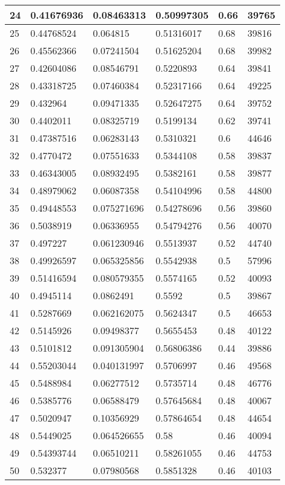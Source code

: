 \begin{longtable}{|l|l|l|l|l|l|}
24 & 0.41676936 & 0.08463313 & 0.50997305 & 0.66 & 39765 \\ \hline 
25 & 0.44768524 & 0.064815 & 0.51316017 & 0.68 & 39816 \\ \hline 
26 & 0.45562366 & 0.07241504 & 0.51625204 & 0.68 & 39982 \\ \hline 
27 & 0.42604086 & 0.08546791 & 0.5220893 & 0.64 & 39841 \\ \hline 
28 & 0.43318725 & 0.07460384 & 0.52317166 & 0.64 & 49225 \\ \hline 
29 & 0.432964 & 0.09471335 & 0.52647275 & 0.64 & 39752 \\ \hline 
30 & 0.4402011 & 0.08325719 & 0.5199134 & 0.62 & 39741 \\ \hline 
31 & 0.47387516 & 0.06283143 & 0.5310321 & 0.6 & 44646 \\ \hline 
32 & 0.4770472 & 0.07551633 & 0.5344108 & 0.58 & 39837 \\ \hline 
33 & 0.46343005 & 0.08932495 & 0.5382161 & 0.58 & 39877 \\ \hline 
34 & 0.48979062 & 0.06087358 & 0.54104996 & 0.58 & 44800 \\ \hline 
35 & 0.49448553 & 0.075271696 & 0.54278696 & 0.56 & 39860 \\ \hline 
36 & 0.5038919 & 0.06336955 & 0.54794276 & 0.56 & 40070 \\ \hline 
37 & 0.497227 & 0.061230946 & 0.5513937 & 0.52 & 44740 \\ \hline 
38 & 0.49926597 & 0.065325856 & 0.5542938 & 0.5 & 57996 \\ \hline 
39 & 0.51416594 & 0.080579355 & 0.5574165 & 0.52 & 40093 \\ \hline 
40 & 0.4945114 & 0.0862491 & 0.5592 & 0.5 & 39867 \\ \hline 
41 & 0.5287669 & 0.062162075 & 0.5624347 & 0.5 & 46653 \\ \hline 
42 & 0.5145926 & 0.09498377 & 0.5655453 & 0.48 & 40122 \\ \hline 
43 & 0.5101812 & 0.091305904 & 0.56806386 & 0.44 & 39886 \\ \hline 
44 & 0.55203044 & 0.040131997 & 0.5706997 & 0.46 & 49568 \\ \hline 
45 & 0.5488984 & 0.06277512 & 0.5735714 & 0.48 & 46776 \\ \hline 
46 & 0.5385776 & 0.06588479 & 0.57645684 & 0.48 & 40067 \\ \hline 
47 & 0.5020947 & 0.10356929 & 0.57864654 & 0.48 & 44654 \\ \hline 
48 & 0.5449025 & 0.064526655 & 0.58 & 0.46 & 40094 \\ \hline 
49 & 0.54393744 & 0.06510211 & 0.58261055 & 0.46 & 44753 \\ \hline 
50 & 0.532377 & 0.07980568 & 0.5851328 & 0.46 & 40103 \\ \hline 
\end{longtable}